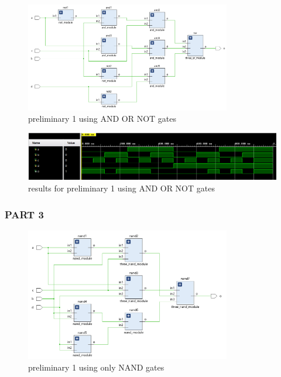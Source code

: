\documentclass[pdftex,12pt,a4paper]{article}
\begin{document}
    \begin{figure}[H]
    	\centering
    	\includegraphics[width=0.8\textwidth]{schematic/prelim_1_d_sch.png}	
    	\caption{preliminary 1 using AND OR NOT gates}
    	\label{preliminary 1 using AND OR NOT gates}
    \end{figure}


    \begin{figure}[H]
    	\centering
    	\includegraphics[width=1\textwidth]{simulations/prelim_1_d_result.png}	
    	\caption{results for preliminary 1 using AND OR NOT gates}
    	\label{results for preliminary 1 using AND OR NOT gates}
    \end{figure}



\subsubsection{PART 3}

    \begin{figure}[H]
    	\centering
    	\includegraphics[width=0.8\textwidth]{schematic/prelim_1_e_sch.png}	
    	\caption{preliminary 1 using only NAND gates}
    	\label{preliminary 1 using only NAND gates}
    \end{figure}
\end{document}
